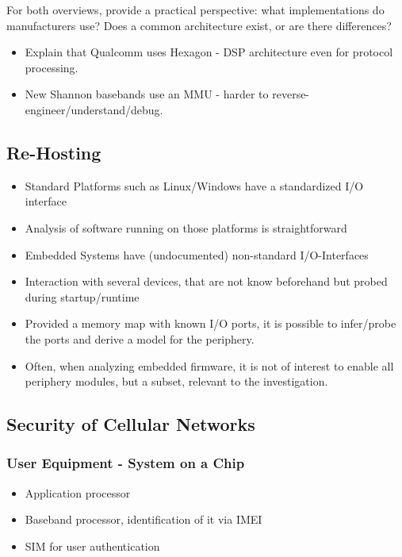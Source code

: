 For both overviews, provide a practical perspective: what implementations do manufacturers use?
Does a common architecture exist, or are there differences?
\begin{itemize}
  \item Explain that Qualcomm uses Hexagon - DSP architecture even for protocol processing.
  \item New Shannon basebands use an MMU - harder to reverse-engineer/understand/debug.
\end{itemize}


\subsection{Re-Hosting}


\begin{itemize}
  \item Standard Platforms such as Linux/Windows have a standardized I/O interface
  \item Analysis of software running on those platforms is straightforward
  \item Embedded Systems have (undocumented) non-standard I/O-Interfaces
  \item Interaction with several devices, that are not know beforehand but probed during startup/runtime
  \item Provided a memory map with known I/O ports, it is possible to infer/probe the ports and derive a model for the periphery.
  \item Often, when analyzing embedded firmware, it is not of interest to enable all periphery modules, but a subset, relevant to the investigation.
\end{itemize}


\subsection{Security of Cellular Networks}
\subsubsection{User Equipment - System on a Chip}
\begin{itemize}
  \item Application processor
  \item Baseband processor, identification of it via IMEI
  \item SIM for user authentication
\end{itemize}
